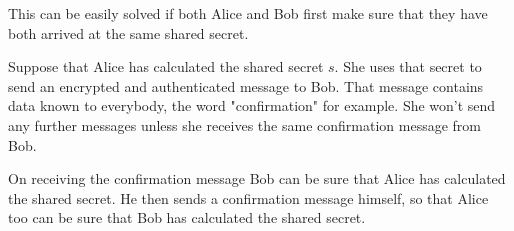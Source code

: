 This can be easily solved if both Alice and Bob first make sure that they have both arrived at the same shared secret.

Suppose that Alice has calculated the shared secret $s$. She uses that secret to send an encrypted and authenticated message to Bob.
That message contains data known to everybody, the word "confirmation" for example.
She won't send any further messages unless she receives the same confirmation message from Bob.

On receiving the confirmation message Bob can be sure that Alice has calculated the shared secret.
He then sends a confirmation message himself, so that Alice too can be sure that Bob has calculated the shared secret.
